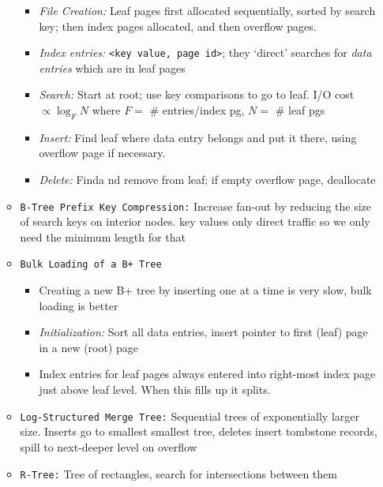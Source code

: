 \documentclass[landscape,8pt]{extarticle}
\newcommand{\code}{\lstinline}
\begin{document}
\begin{multicols}{4}
\begin{itemize}
\begin{itemize}
\begin{itemize}
                            \item \emph{File Creation:} Leaf pages first allocated sequentially, sorted by search key; then index pages allocated, and then overflow pages.
                            \item \emph{Index entries:} \code{<key value, page id>}; they `direct' searches for \emph{data entries} which are in leaf pages
                            \item \emph{Search:} Start at root; use key comparisons to go to leaf. I/O cost $\propto \log_F N$ where $F = $ \# entries/index pg, $N = $ \# leaf pgs
                            \item \emph{Insert:} Find leaf where data entry belongs and put it there, using overflow page if necessary.
                            \item \emph{Delete:} Finda nd remove from leaf; if empty overflow page, deallocate
                        \end{itemize}
                  \item \code{B-Tree Prefix Key Compression:} Increase fan-out by reducing the size of search keys on interior nodes. key values only direct traffic so we only need the minimum length for that
                  \item \code{Bulk Loading of a B+ Tree}
                        \begin{itemize}
                            \item Creating a new B+ tree by inserting one at a time is very slow, bulk loading is better
                            \item \emph{Initialization:} Sort all data entries, insert pointer to first (leaf) page in a new (root) page
                            \item Index entries for leaf pages always entered into right-most index page just above leaf level. When this fills up it splits.
                        \end{itemize}
                  \item \code{Log-Structured Merge Tree:} Sequential trees of exponentially larger size. Inserts go to smallest smallest tree, deletes insert tombstone records, spill to next-deeper level on overflow
                  \item \code{R-Tree:} Tree of rectangles, search for intersections between them


\end{itemize}
\end{itemize}
\end{multicols}
\end{document}
